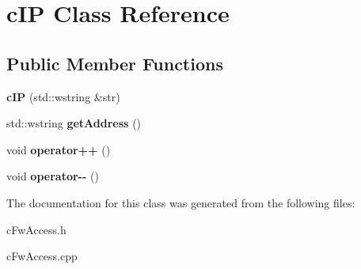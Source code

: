 \hypertarget{classc_i_p}{}\section{c\+I\+P Class Reference}
\label{classc_i_p}
\subsection*{Public Member Functions}
\begin{DoxyCompactItemize}
\item 
\hypertarget{classc_i_p_ae9d9e90ce86313975ada70a76439d867}{}{\bfseries c\+I\+P} (std\+::wstring \&str)\label{classc_i_p_ae9d9e90ce86313975ada70a76439d867}

\item 
\hypertarget{classc_i_p_aca751ad714dfdf3d2d68978cdd2f991c}{}std\+::wstring {\bfseries get\+Address} ()\label{classc_i_p_aca751ad714dfdf3d2d68978cdd2f991c}

\item 
\hypertarget{classc_i_p_a8c02fa1e70a46745e18d8305b3f6e80c}{}void {\bfseries operator++} ()\label{classc_i_p_a8c02fa1e70a46745e18d8305b3f6e80c}

\item 
\hypertarget{classc_i_p_a7941c75ef13e4df9abb263f3af12d629}{}void {\bfseries operator-\/-\/} ()\label{classc_i_p_a7941c75ef13e4df9abb263f3af12d629}

\end{DoxyCompactItemize}


The documentation for this class was generated from the following files\+:\begin{DoxyCompactItemize}
\item 
c\+Fw\+Access.\+h\item 
c\+Fw\+Access.\+cpp\end{DoxyCompactItemize}
